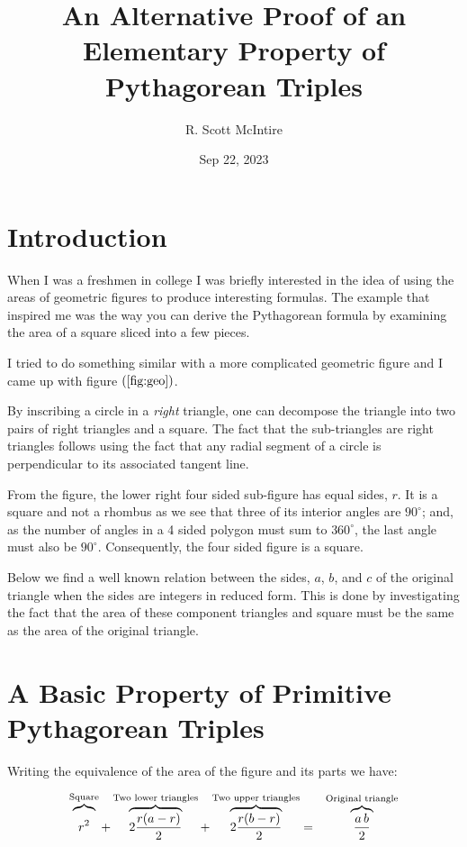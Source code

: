\documentclass[12pt]{article}
\title{An Alternative Proof of an Elementary Property of Pythagorean Triples}
\author{R. Scott McIntire}
\date{Sep 22, 2023}
\begin{document}
\maketitle

\section{Introduction}
When I was a freshmen in college I was briefly interested in the idea of 
using the areas of geometric figures to
produce interesting formulas. The example that inspired me was the way you 
can derive the Pythagorean formula
by examining the area of a square sliced into a few pieces.

I tried to do something similar with a more complicated geometric figure and 
I came up with figure $(\ref{fig:geo})$.

By inscribing a circle in a {\em right\/} triangle, one can decompose the triangle 
into two pairs of right triangles and a square. The fact that the sub-triangles
are right triangles follows using the fact that 
any radial segment of a circle is perpendicular to its
associated tangent line. 

From the figure, the lower right four sided sub-figure has equal sides, $r$.
It is a square and not a rhombus as we 
see that three of its interior angles are 
$90^\circ$; and, as the number of angles in a 4 sided polygon must sum to 
$360^\circ$, the last angle must also be $90^\circ$.
Consequently, the four sided figure is a square.

Below we find a well known relation between the sides, $a$, $b$, and $c$ of the
original triangle when the sides are integers in reduced form.
This is done by investigating the fact that the area of these component triangles 
and square must be the same as the area of the original triangle. 

\section{A Basic Property of Primitive Pythagorean Triples}
Writing the equivalence of the area of the figure and its parts we have:

\begin{eqnarray}
    \overbrace{\vphantom{\frac{X^1}{X}}r^2}^{\text{Square}} 
    + \overbrace{2 \frac{r(a - r)}{2}}^{\text{Two lower triangles}} 
    + \overbrace{2 \frac{r(b-r)}{2}}^{\text{Two upper triangles}}  
    &=& \overbrace{\frac{a\, b}{2}}^{\text{Original triangle}}  
\end{eqnarray}
\end{document}
